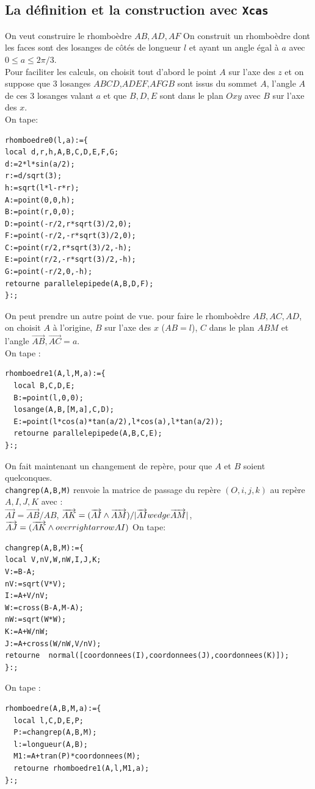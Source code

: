 \documentclass[a4paper,11pt]{book}
\begin{document}
\subsection{La d\'efinition et la construction avec {\tt Xcas}}
On veut construire le rhombo\`edre $AB,AD,AF$
On construit un rhombo\`edre dont les faces sont des losanges de c\^ot\'es de 
longueur $l$ et ayant un angle \'egal \`a $a$ avec $0\leq a\leq 2\pi/3$.\\
Pour faciliter les calculs, on choisit tout d'abord le point $A$ sur l'axe des $z$ et on suppose que 3 losanges $ABCD$,$ADEF$,$AFGB$ sont issus 
du sommet $A$, l'angle $A$ de ces 3 losanges valant $a$ et que $B,D,E$ sont 
dans le plan $Oxy$ avec $B$ sur l'axe des $x$.\\ 
On tape:
\begin{verbatim}
rhomboedre0(l,a):={
local d,r,h,A,B,C,D,E,F,G;
d:=2*l*sin(a/2);
r:=d/sqrt(3);
h:=sqrt(l*l-r*r);
A:=point(0,0,h);
B:=point(r,0,0);
D:=point(-r/2,r*sqrt(3)/2,0);
F:=point(-r/2,-r*sqrt(3)/2,0);
C:=point(r/2,r*sqrt(3)/2,-h);
E:=point(r/2,-r*sqrt(3)/2,-h);
G:=point(-r/2,0,-h);
retourne parallelepipede(A,B,D,F);
}:;
\end{verbatim}
On peut prendre un autre point de vue. pour faire le  rhombo\`edre
$AB,AC,AD$, on choisit $A$ \`a l'origine, $B$ sur l'axe des $x$ ($AB=l$), $C$ 
dans le plan $ABM$ et l'angle $\overrightarrow{AB},\overrightarrow{AC}=a$.\\
On tape :
\begin{verbatim}
rhomboedre1(A,l,M,a):={
  local B,C,D,E;
  B:=point(l,0,0);
  losange(A,B,[M,a],C,D);
  E:=point(l*cos(a)*tan(a/2),l*cos(a),l*tan(a/2));
  retourne parallelepipede(A,B,C,E);
}:;
\end{verbatim}
On fait maintenant un changement de rep\`ere, pour que  $A$ et $B$ 
soient quelconques.\\
{\tt changrep(A,B,M)} renvoie la matrice de passage du rep\`ere $(O,i,j,k)$
au rep\`ere $A,I,J,K$ avec :\\
$\overrightarrow{AI}=\overrightarrow{AB}/AB$,
$\overrightarrow{AK}=(\overrightarrow{AI}\wedge\overrightarrow{AM})/|\overrightarrow{AI}\\wedge\overrightarrow{AM}|$,\\ 
$\overrightarrow{AJ}=(\overrightarrow{AK}\wedge\\overrightarrow{AI})$
On tape:\\
\begin{verbatim}
changrep(A,B,M):={
local V,nV,W,nW,I,J,K;
V:=B-A;
nV:=sqrt(V*V); 
I:=A+V/nV; 
W:=cross(B-A,M-A);
nW:=sqrt(W*W); 
K:=A+W/nW;
J:=A+cross(W/nW,V/nV);
retourne  normal([coordonnees(I),coordonnees(J),coordonnees(K)]);
}:;
\end{verbatim}
On tape :
\begin{verbatim}
rhomboedre(A,B,M,a):={
  local l,C,D,E,P;
  P:=changrep(A,B,M);
  l:=longueur(A,B);
  M1:=A+tran(P)*coordonnees(M);
  retourne rhomboedre1(A,l,M1,a);
}:;
\end{verbatim}
\end{document}
